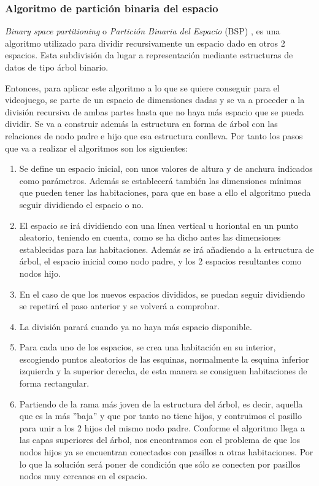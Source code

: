 \subsubsection{Algoritmo de partición binaria del espacio} 
\label{subsubsec:particionbinaria}

\textit{Binary space partitioning} o \textit{Partición Binaria del Espacio} (BSP) \cite{BSP}, es una algoritmo utilizado para dividir recursivamente un espacio dado en otros 2 espacios. Esta subdivisión da lugar a representación mediante estructuras de datos de tipo árbol binario.

Entonces, para aplicar este algoritmo a lo que se quiere conseguir para el videojuego, se parte de un espacio de dimensiones dadas y se va a proceder a la división recursiva de ambas partes hasta que no haya más espacio que se pueda dividir. Se va a construir además la estructura en forma de árbol con las relaciones de nodo padre e hijo que esa estructura conlleva. Por tanto los pasos que va a realizar el algoritmos son los siguientes:

\begin{enumerate}
    \item Se define un espacio inicial, con unos valores de altura y de anchura indicados como parámetros. Además se establecerá también las dimensiones mínimas que pueden tener las habitaciones, para que en base a ello el algoritmo pueda seguir dividiendo el espacio o no.
    
    \item El espacio se irá dividiendo con una línea vertical u horiontal en un punto aleatorio, teniendo en cuenta, como se ha dicho antes las dimensiones establecidas para las habitaciones. Además se irá añadiendo a la estructura de árbol, el espacio inicial como nodo padre, y los 2 espacios resultantes como nodos hijo.
    
    \item En el caso de que los nuevos espacios divididos, se puedan seguir dividiendo se repetirá el paso anterior y se volverá a comprobar.
    
    \item La división parará cuando ya no haya más espacio disponible.
    
    \item Para cada uno de los espacios, se crea una habitación en su interior, escogiendo puntos aleatorios de las esquinas, normalmente la esquina inferior izquierda y la superior derecha, de esta manera se consiguen habitaciones de forma rectangular. 
    
    \item Partiendo de la rama más joven de la estructura del árbol, es decir, aquella que es la más ''baja'' y que por tanto no tiene hijos, y contruimos el pasillo para unir a los 2 hijos del mismo nodo padre. Conforme el algoritmo llega a las capas superiores del árbol, nos encontramos con el problema de que los nodos hijos ya se encuentran conectados con pasillos a otras habitaciones. Por lo que la solución será poner de condición que sólo se conecten por pasillos nodos muy cercanos en el espacio.  
    
\end{enumerate}

